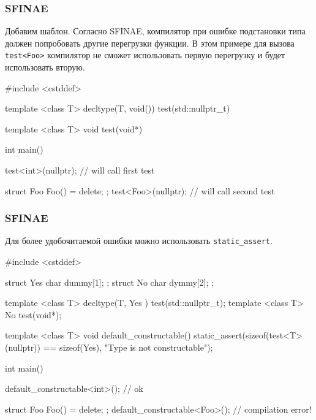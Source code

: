\documentclass[compress, 8pt, aspectratio=169]{beamer}
\begin{document}
  \begin{frame}[fragile]

    \frametitle{SFINAE}

    Добавим шаблон.
    Согласно SFINAE, компилятор при ошибке подстановки типа
    должен попробовать другие перегрузки функции.
    В этом примере для вызова \verb|test<Foo>| компилятор не сможет
    использовать первую перегрузку и будет использовать вторую.

    \begin{myinplacelisting}[minted language=cpp]
#include <cstddef>

template <class T>
decltype(T{}, void()) test(std::nullptr_t) {}

template <class T>
void test(void*) {}

int main() {
    test<int>(nullptr); // will call first test

    struct Foo { Foo() = delete; };
    test<Foo>(nullptr); // will call second test
}
    \end{myinplacelisting}

  \end{frame}

  \begin{frame}[fragile]

    \frametitle{SFINAE}

    Для более удобочитаемой ошибки можно использовать \verb|static_assert|.

    \begin{myinplacelisting}[minted language=cpp]
#include <cstddef>

struct Yes { char dummy[1]; };
struct No { char dymmy[2]; };

template <class T> decltype(T{}, Yes {}) test(std::nullptr_t);
template <class T> No test(void*);

template <class T> void default_constructable() {
    static_assert(sizeof(test<T>(nullptr)) == sizeof(Yes),
        "Type is not constructable");
}

int main() {
    default_constructable<int>(); // ok

    struct Foo { Foo() = delete; };
    default_constructable<Foo>(); // compilation error!
}
    \end{myinplacelisting}

  \end{frame}
\end{document}

